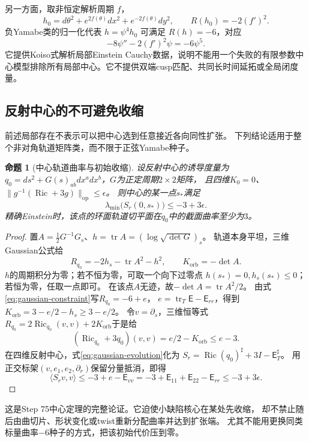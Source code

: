\documentclass[UTF8,a4paper,11pt,fontset=fandol]{ctexart}
\numberwithin{equation}{section}
\newtheorem{proposition}[theorem]{命题}
\theoremstyle{definition}
\newcommand{\Ric}{\operatorname{Ric}}
\newcommand{\tr}{\operatorname{tr}}
\newcommand{\op}{\mathrm{op}}
\begin{document}
另一方面，取非恒定解析周期 $f$，
\[
h_0=d\theta^2+e^{2f(\theta)}dx^2+e^{-2f(\theta)}dy^2,
\qquad R(h_0)=-2(f')^2.
\]
负Yamabe类的归一化代表 $h=\psi^4h_0$ 可满足 $R(h)=-6$，对应
\[
-8\psi''-2(f')^2\psi=-6\psi^5.
\]
它提供Koiso式解析局部Einstein Cauchy数据，说明不能用一个失败的有限参数中心模型排除所有局部中心。它不提供双端cusp匹配、共同长时间延拓或全局闭度量。

\subsection{反射中心的不可避免收缩}
前述局部存在不表示可以把中心选到任意接近各向同性扩张。
下列结论适用于整个非对角轨道矩阵类，而不限于正弦Yamabe种子。
\begin{proposition}[中心轨道曲率与初始收缩]\label{prop:center-contraction}
设反射中心的诱导度量为
$q_0=ds^2+G(s)_{ab}dx^adx^b$，$G$为正定周期$2\times2$矩阵，
且四维$K_0=0$、$\|g^{-1}(\Ric+3g)\|_\op\le\epsilon$。
则中心的某一点$s_*$满足
\[
 \lambda_{\min}\bigl(S_r(0,s_*)\bigr)\le-3+3\epsilon.
\]
精确Einstein时，该点的环面轨道切平面在$q_0$中的截面曲率至少为$3$。
\end{proposition}
\begin{proof}
置$A=\frac12G^{-1}G_s$、$h=\tr A=(\log\sqrt{\det G})_s$。
轨道本身平坦，三维Gaussian公式给
 \begin{equation}\label{eq:center-slice-scalar}
 R_{q_0}=-2h_s-\tr A^2-h^2,\qquad
 K_{\mathrm{orb}}=-\det A.
 \end{equation}
$h$的周期积分为零；若不恒为零，可取一个向下过零点
$h(s_*)=0,h_s(s_*)\le0$；若恒为零，任取一点即可。
在该点$A$无迹，故$-\det A=\tr A^2/2$。
由式\eqref{eq:gaussian-constraint}写$R_{q_0}=-6+e$，
$e=\tr_T\mathsf E-\mathsf E_{rr}$，得到
$K_{\mathrm{orb}}=3-e/2-h_s\ge3-e/2$。
令$v=\partial_s$，三维恒等式
$R_{q_0}=2\Ric_{q_0}(v,v)+2K_{\mathrm{orb}}$于是给
\[
 (\Ric_{q_0}+3q_0)(v,v)=e/2-K_{\mathrm{orb}}\le e-3.
\]
在四维反射中心，式\eqref{eq:gaussian-evolution}化为
$S_r=\Ric(q_0)^\sharp+3I-\mathsf E_T^\sharp$。
用正交标架$(v,e_1,e_2,\partial_r)$保留分量抵消，即得
\[
 \langle S_rv,v\rangle
 \le-3+e-\mathsf E_{vv}
 =-3+\mathsf E_{11}+\mathsf E_{22}-\mathsf E_{rr}
 \le-3+3\epsilon.
\]
\end{proof}
这是Step 75中心定理的完整论证。它迫使小缺陷核心在某处先收缩，
却不禁止随后由曲切片、形状变化或twist重新分配曲率并达到扩张端。
尤其不能用更换同类标量曲率$-6$种子的方式，把该初始代价压到零。
\end{document}
